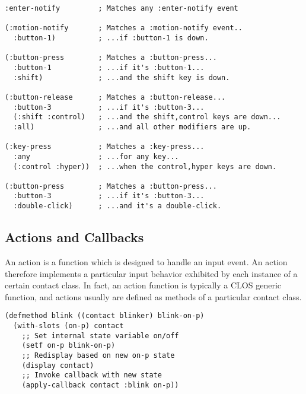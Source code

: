 \begin{verbatim} 
:enter-notify         ; Matches any :enter-notify event

(:motion-notify       ; Matches a :motion-notify event..
  :button-1)          ; ...if :button-1 is down.

(:button-press        ; Matches a :button-press...
  :button-1           ; ...if it's :button-1...
  :shift)             ; ...and the shift key is down.

(:button-release      ; Matches a :button-release...
  :button-3           ; ...if it's :button-3...
  (:shift :control)   ; ...and the shift,control keys are down...
  :all)               ; ...and all other modifiers are up.

(:key-press           ; Matches a :key-press...
  :any                ; ...for any key...
  (:control :hyper))  ; ...when the control,hyper keys are down.

(:button-press        ; Matches a :button-press...
  :button-3           ; ...if it's :button-3...
  :double-click)      ; ...and it's a double-click.
\end{verbatim}

\begin{center}
 \end{center}

\subsection{Actions and Callbacks}
An action is a  function which is designed to handle an input
event.  An action therefore implements a particular input behavior exhibited by
each instance of a certain contact class. 
In fact, an action function is typically a CLOS generic function, and actions
usually are defined as methods of a particular contact class. 

\begin{verbatim} 
(defmethod blink ((contact blinker) blink-on-p)
  (with-slots (on-p) contact
    ;; Set internal state variable on/off
    (setf on-p blink-on-p)
    ;; Redisplay based on new on-p state
    (display contact)
    ;; Invoke callback with new state
    (apply-callback contact :blink on-p))
\end{verbatim}

